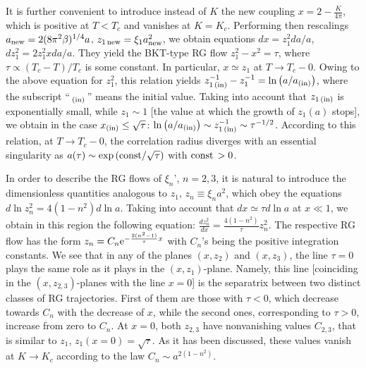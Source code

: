\documentclass[a4paper,12pt]{article}
\begin{document}
It is further convenient to introduce instead of $K$ the new coupling $x=2-\frac{K}{4\pi}$, which is positive at $T<T_c$ and
vanishes at $K=K_c$. Performing then rescalings $a_{\rm new}=2(8\pi^2\beta)^{1/4}a$, $z_{1{\,}\rm new}=\xi_1a_{\rm new}^2$, we obtain
equations $dx=z_1^2da/a$, $dz_1^2=2z_1^2xda/a$. They yield the BKT-type RG flow $z_1^2-x^2=\tau$, where
$\tau\propto(T_c-T)/T_c$ is some constant.
In particular, $x\simeq z_1$ at $T\to T_c-0$. Owing to the above equation for $z_1^2$, this relation yields
$z_{1{\,}(\rm in)}^{-1}-z_1^{-1}=\ln\left(a/a_{(\rm in)}\right)$, where the subscript ``${\,}{}_{(\rm in)}{\,}$''
means the initial value.
Taking into account that $z_{1{\,}(\rm in)}$ is exponentially small, while
$z_1\sim 1$ [the value at which the growth of $z_1(a)$ stops], we obtain in the case $x_{(\rm in)}\le\sqrt{\tau}$:
$\ln\left(a/a_{(\rm in)}\right)\sim z_{1{\,}(\rm in)}^{-1}\sim\tau^{-1/2}$. According to this relation,
at $T\to T_c-0$, the correlation radius diverges with an essential singularity as
$a(\tau)\sim\exp\left({\rm const}/\sqrt{\tau}\right)$ with ${\rm const}{\,}>0$.

In order to describe the RG flows of $\xi_n$', $n=2,3$, it is natural to introduce the dimensionless
quantities analogous to $z_1$, $z_n\equiv\xi_na^2$, which obey the equations
$d\ln z_n^2=4(1-n^2)d\ln a$. Taking into account that $dx\simeq\tau d\ln a$ at $x\ll 1$,
we obtain in this region the following equation: $\frac{dz_n^2}{dx}=\frac{4(1-n^2)}{\tau}z_n^2$.
The respective RG flow has the form $z_n=C_n{\rm e}^{-\frac{2(n^2-1)}{\tau}x}$
with $C_n$'s being the positive integration constants. We see that
in any of the planes $(x, z_2)$ and
$(x, z_3)$, the line $\tau=0$ plays the same role as it plays in the $(x, z_1)$-plane. Namely, this line [coinciding in the
$(x, z_{2,3})$-planes with the
line $x=0$] is the separatrix
between two distinct classes of RG trajectories. First of them are
those with $\tau<0$, which decrease towards $C_n$ with the
decrease of $x$, while the second ones, corresponding to $\tau>0$, increase from zero to
$C_n$. At $x=0$, both $z_{2,3}$ have nonvanishing values $C_{2,3}$, that is similar to $z_1$,
$z_1(x=0)=\sqrt{\tau}$. As it has been discussed, these values vanish
at $K\to K_c$ according to the law $C_n\sim a^{2(1-n^2)}$.
\end{document}
